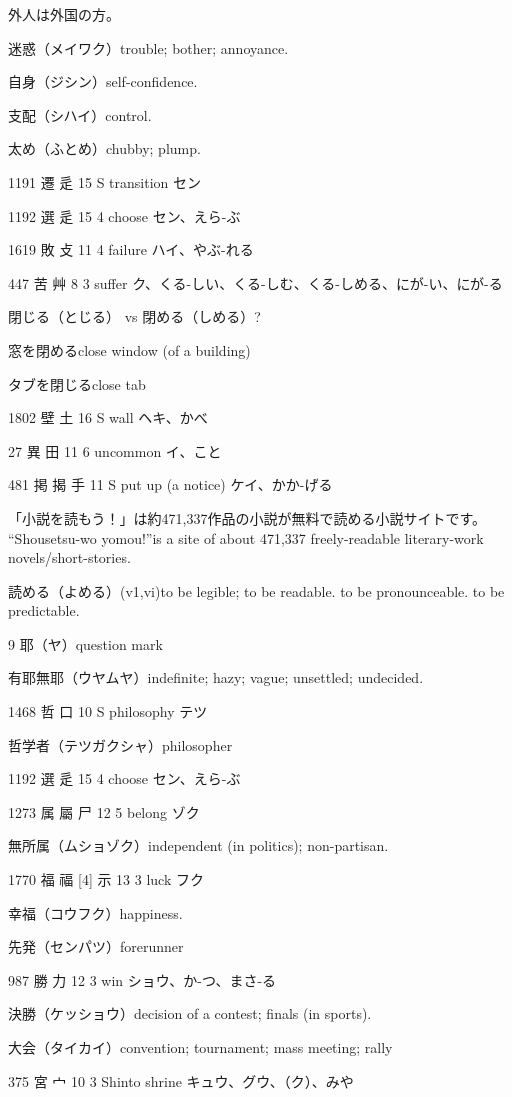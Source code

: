 外人は外国の方。

迷惑（メイワク）trouble; bother; annoyance.

自身（ジシン）self-confidence.

支配（シハイ）control.

太め（ふとめ）chubby; plump.

1191	遷		辵	15	S		transition	セン

1192	選		辵	15	4		choose	セン、えら-ぶ

1619	敗		攴	11	4		failure	ハイ、やぶ-れる

447	苦		艸	8	3		suffer	ク、くる-しい、くる-しむ、くる-しめる、にが-い、にが-る

閉じる（とじる） vs 閉める（しめる）?

窓を閉めるclose window (of a building)

タブを閉じるclose tab

1802	壁		土	16	S		wall	ヘキ、かべ

27	異		田	11	6		uncommon	イ、こと

481	掲	揭	手	11	S		put up (a notice)	ケイ、かか-げる

「小説を読もう！」は約471,337作品の小説が無料で読める小説サイトです。
``Shousetsu-wo yomou!''is a site of about 471,337 freely-readable literary-work novels/short-stories.

読める（よめる）(v1,vi)to be legible; to be readable.
to be pronounceable.
to be predictable.

9 耶（ヤ）question mark

有耶無耶（ウヤムヤ）indefinite; hazy; vague; unsettled; undecided.

1468	哲		口	10	S		philosophy	テツ

哲学者（テツガクシャ）philosopher

1192	選		辵	15	4		choose	セン、えら-ぶ

1273	属	屬	尸	12	5		belong	ゾク

無所属（ムショゾク）independent (in politics); non-partisan.

1770	福	福 [4]	示	13	3		luck	フク

幸福（コウフク）happiness.

先発（センパツ）forerunner

987	勝		力	12	3		win	ショウ、か-つ、まさ-る

決勝（ケッショウ）decision of a contest; finals (in sports).

大会（タイカイ）convention; tournament; mass meeting; rally

375	宮		宀	10	3		Shinto shrine	キュウ、グウ、（ク）、みや

